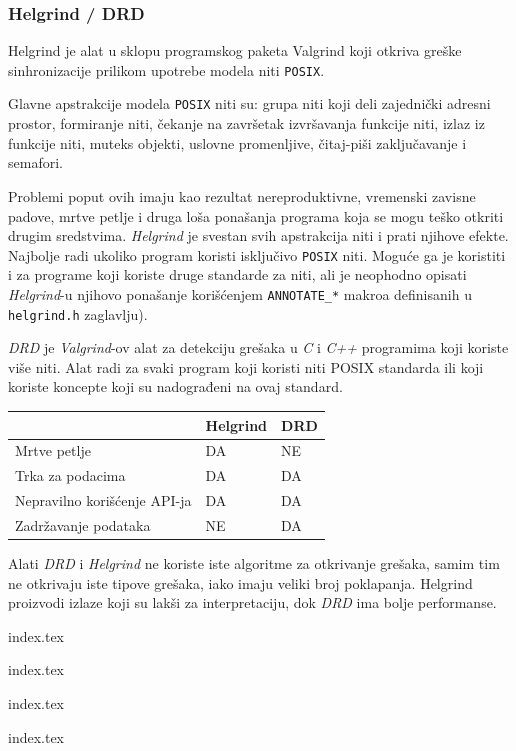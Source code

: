 \subsubsection{Helgrind / DRD}\label{helgrind--drd}

Helgrind je alat u sklopu programskog paketa Valgrind koji otkriva greške sinhronizacije prilikom upotrebe modela niti \texttt{POSIX}.

Glavne apstrakcije modela \texttt{POSIX} niti su: grupa niti koji deli zajednički adresni prostor, formiranje niti, čekanje na završetak izvršavanja funkcije niti, izlaz iz funkcije niti, muteks objekti, uslovne promenljive, čitaj-piši zaključavanje i semafori.

Problemi poput ovih imaju kao rezultat nereproduktivne, vremenski zavisne padove, mrtve petlje i druga loša ponašanja programa koja se mogu teško otkriti drugim sredstvima. \emph{Helgrind} je svestan svih apstrakcija niti i prati njihove efekte. Najbolje radi ukoliko program koristi isključivo \texttt{POSIX} niti. Moguće ga je koristiti i za programe koji koriste druge standarde za niti, ali je neophodno opisati \emph{Helgrind}-u njihovo ponašanje korišćenjem \texttt{ANNOTATE\_*} makroa definisanih u \texttt{helgrind.h} zaglavlju).

\emph{DRD} je \emph{Valgrind}-ov alat za detekciju grešaka u \emph{C} i \emph{C++} programima koji koriste više niti. Alat radi za svaki program koji koristi niti POSIX standarda ili koji koriste koncepte koji su nadograđeni na ovaj standard.

\begin{longtable}[]{@{}lll@{}}
\toprule\noalign{}
& Helgrind & DRD \\
\midrule\noalign{}
\endhead
\bottomrule\noalign{}
\endlastfoot
Mrtve petlje & DA & NE \\
Trka za podacima & DA & DA \\
Nepravilno korišćenje API-ja & DA & DA \\
Zadržavanje podataka & NE & DA \\
\end{longtable}

Alati \emph{DRD} i \emph{Helgrind} ne koriste iste algoritme za otkrivanje grešaka, samim tim ne otkrivaju iste tipove grešaka, iako imaju veliki broj poklapanja. Helgrind proizvodi izlaze koji su lakši za interpretaciju, dok \emph{DRD} ima bolje performanse.

{index.tex}

{index.tex}

{index.tex}

{index.tex}
